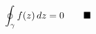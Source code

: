 \documentclass[preview]{standalone}
\begin{document}
\begin{align*}
\special{dvisvgm:raw <g id='unique000'>}\oint_{\gamma} f(z)\,dz = 0 \qquad \blacksquare\special{dvisvgm:raw </g>}
\end{align*}
\end{document}
